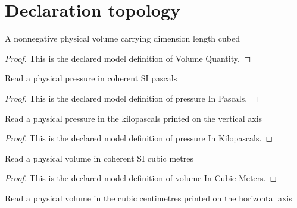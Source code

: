 \section{Declaration topology}
\begin{definition}
  \label{def:physics:phyx-mini-0430:phyxminiproblems-problemphyxmini0430-volumequantity}
  A nonnegative physical volume carrying dimension length cubed
\end{definition}
\begin{proof}
  This is the declared model definition of Volume Quantity.
\end{proof}
\begin{definition}
  \label{def:physics:phyx-mini-0430:phyxminiproblems-problemphyxmini0430-pressureinpascals}
  Read a physical pressure in coherent SI pascals
\end{definition}
\begin{proof}
  This is the declared model definition of pressure In Pascals.
\end{proof}
\begin{definition}
  \label{def:physics:phyx-mini-0430:phyxminiproblems-problemphyxmini0430-pressureinkilopascals}
  Read a physical pressure in the kilopascals printed on the vertical axis
\end{definition}
\begin{proof}
  This is the declared model definition of pressure In Kilopascals.
\end{proof}
\begin{definition}
  \label{def:physics:phyx-mini-0430:phyxminiproblems-problemphyxmini0430-volumeincubicmeters}
  Read a physical volume in coherent SI cubic metres
\end{definition}
\begin{proof}
  This is the declared model definition of volume In Cubic Meters.
\end{proof}
\begin{definition}
  \label{def:physics:phyx-mini-0430:phyxminiproblems-problemphyxmini0430-volumeincubiccentimeters}
  Read a physical volume in the cubic centimetres printed on the horizontal axis
\end{definition}
